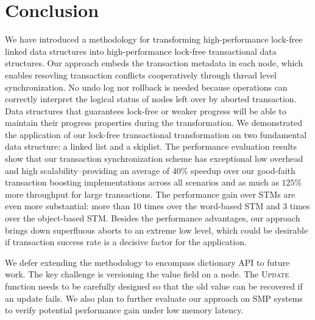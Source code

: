 \documentclass[10pt,conference,compsocconf]{IEEEtran}
\begin{document}
\section{Conclusion}
\label{sec:conclusion}
We have introduced a methodology for transforming high-performance lock-free linked data structures into high-performance lock-free transactional data structures. 
Our approach embeds the transaction metadata in each node, which enables resovling transaction conflicts cooperatively through thread level synchronization.
No undo log nor rollback is needed because operations can correctly interpret the logical status of nodes left over by aborted transaction.
Data structures that guarantees lock-free or weaker progress will be able to maintain their progress properties during the transformation.
We demonstrated the application of our lock-free transactional transformation on two fundamental data structure: a linked list and a skiplist.  
The performance evaluation results show that our transaction synchronization scheme has exceptional low overhead and high scalability--providing an average of $40\%$ speedup over our good-faith transaction boosting implementations across all scenarios and as much as $125\%$ more throughput for large transactions.
The performance gain over STMs are even more substantial: more than 10 times over the word-based STM and 3 times over the object-based STM.
Besides the performance advantages, our approach brings down superfluous aborts to an extreme low level, which could be desirable if transaction success rate is a decisive factor for the application.

We defer extending the methodology to encompass dictionary API to future work.
The key challenge is versioning the value field on a node.
The \textsc{Update} function needs to be carefully designed so that the old value can be recovered if an update fails.
We also plan to further evaluate our approach on SMP systems to verify potential performance gain under low memory latency.



\end{document}
